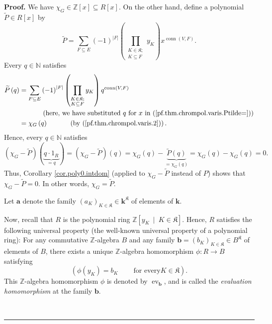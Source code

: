 \documentclass[numbers=enddot,12pt,final,onecolumn,notitlepage]{scrartcl}%
\theoremstyle{definition}
\newenvironment{proof}[1][Proof]{\noindent\textbf{#1.} }{\ \rule{0.5em}{0.5em}}
\newenvironment{verlong}{}{}
\let\sumnonlimits\sum
\let\prodnonlimits\prod
\renewcommand{\sum}{\sumnonlimits\limits}
\renewcommand{\prod}{\prodnonlimits\limits}
\begin{document}
\begin{verlong}
\begin{proof}
We have $\chi_{G}\in\mathbb{Z}\left[  x\right]  \subseteq R\left[  x\right]
$. On the other hand, define a polynomial $\widetilde{P}\in R\left[  x\right]
$ by%
\begin{equation}
\widetilde{P}=\sum_{F\subseteq E}\left(  -1\right)  ^{\left\vert F\right\vert
}\left(  \prod_{\substack{K\in\mathfrak{K};\\K\subseteq F}}y_{K}\right)
x^{\operatorname*{conn}\left(  V,F\right)  }.
\label{pf.thm.chrompol.varis.Ptilde=}%
\end{equation}
Every $q\in\mathbb{N}$ satisfies%
\begin{align*}
\widetilde{P}\left(  q\right)   &  =\sum_{F\subseteq E}\left(  -1\right)
^{\left\vert F\right\vert }\left(  \prod_{\substack{K\in\mathfrak{K}%
;\\K\subseteq F}}y_{K}\right)  q^{\operatorname*{conn}\left(  V,F\right)  }\\
&  \ \ \ \ \ \ \ \ \ \ \left(  \text{here, we have substituted }q\text{ for
}x\text{ in (\ref{pf.thm.chrompol.varis.Ptilde=})}\right) \\
&  =\chi_{G}\left(  q\right)  \ \ \ \ \ \ \ \ \ \ \left(  \text{by
(\ref{pf.thm.chrompol.varis.2})}\right)  .
\end{align*}
Hence, every $q\in\mathbb{N}$ satisfies%
\[
\left(  \chi_{G}-\widetilde{P}\right)  \left(  \underbrace{q\cdot1_{R}}%
_{=q}\right)  =\left(  \chi_{G}-\widetilde{P}\right)  \left(  q\right)
=\chi_{G}\left(  q\right)  -\underbrace{\widetilde{P}\left(  q\right)
}_{=\chi_{G}\left(  q\right)  }=\chi_{G}\left(  q\right)  -\chi_{G}\left(
q\right)  =0.
\]
Thus, Corollary \ref{cor.poly0.intdom} (applied to $\chi_{G}-\widetilde{P}$
instead of $P$) shows that $\chi_{G}-\widetilde{P}=0$. In other words,
$\chi_{G}=\widetilde{P}$.

Let $\mathbf{a}$ denote the family $\left(  a_{K}\right)  _{K\in\mathfrak{K}%
}\in\mathbf{k}^{\mathfrak{K}}$ of elements of $\mathbf{k}$.

Now, recall that $R$ is the polynomial ring $\mathbb{Z}\left[  y_{K}%
\ \mid\ K\in\mathfrak{K}\right]  $. Hence, $R$ satisfies the following
universal property (the well-known universal property of a polynomial ring):
For any commutative $\mathbb{Z}$-algebra $B$ and any family $\mathbf{b}%
=\left(  b_{K}\right)  _{K\in\mathfrak{K}}\in B^{\mathfrak{K}}$ of elements of
$B$, there exists a unique $\mathbb{Z}$-algebra homomorphism $\phi
:R\rightarrow B$ satisfying%
\[
\left(  \phi\left(  y_{K}\right)  =b_{K}\ \ \ \ \ \ \ \ \ \ \text{for every
}K\in\mathfrak{K}\right)  .
\]
This $\mathbb{Z}$-algebra homomorphism $\phi$ is denoted by
$\operatorname*{ev}\nolimits_{\mathbf{b}}$, and is called the
\textit{evaluation homomorphism} at the family $\mathbf{b}$.


\end{proof}
\end{verlong}
\end{document}
